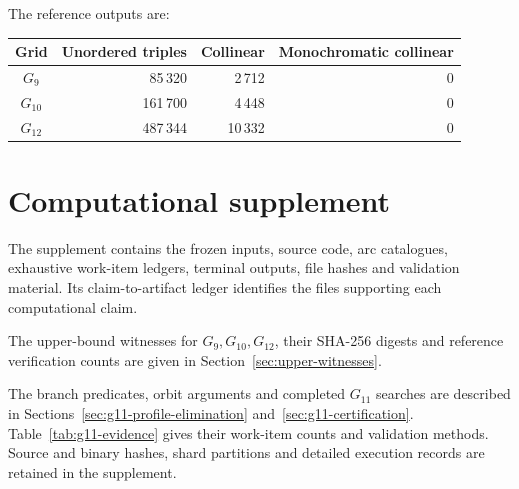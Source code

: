 \documentclass[11pt]{article}
\theoremstyle{definition}
\theoremstyle{remark}
\begin{document}
The reference outputs are:
\begin{center}
\begin{tabular}{@{}crrr@{}}
\toprule
Grid & Unordered triples & Collinear & Monochromatic collinear\\
\midrule
\(G_9\) & 85\,320 & 2\,712 & 0\\
\(G_{10}\) & 161\,700 & 4\,448 & 0\\
\(G_{12}\) & 487\,344 & 10\,332 & 0\\
\bottomrule
\end{tabular}
\end{center}

\section{Computational supplement}
\label{sec:computational-supplement}

The supplement contains the frozen inputs, source code, arc catalogues, exhaustive work-item
ledgers, terminal outputs, file hashes and validation material.  Its
claim-to-artifact ledger identifies the files supporting each computational
claim.

The upper-bound witnesses for \(G_9,G_{10},G_{12}\), their SHA-256
digests and reference verification counts are given in
Section~\ref{sec:upper-witnesses}.

The branch predicates, orbit arguments and completed \(G_{11}\) searches
are described in Sections~\ref{sec:g11-profile-elimination}
and~\ref{sec:g11-certification}.  Table~\ref{tab:g11-evidence} gives their
work-item counts and validation methods.  Source and binary hashes, shard
partitions and detailed execution records are retained in the supplement.
\end{document}
